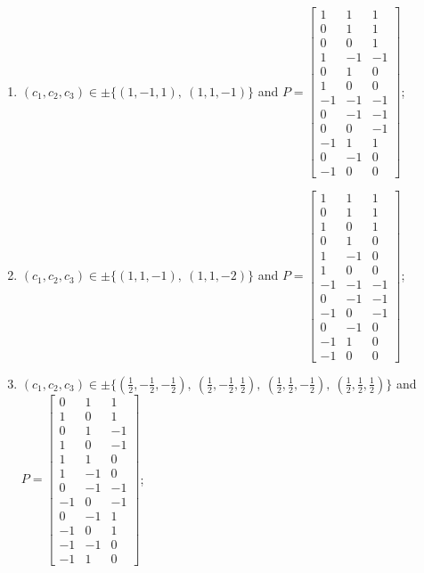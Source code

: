 \begin{enumerate}
\item[(d44)\,\newitem] $(c_1,c_2,c_3)\in \pm\{(1,-1,1),\allowbreak\ (1,1,-1)\}$ and $P=\begin{bmatrix}1&1&1\\0&1&1\\0&0&1\\1&-1&-1\\0&1&0\\1&0&0\\-1&-1&-1\\0&-1&-1\\0&0&-1\\-1&1&1\\0&-1&0\\-1&0&0\end{bmatrix}$;
\item[(d45)\,\newitem] $(c_1,c_2,c_3)\in \pm\{(1,1,-1),\allowbreak\ (1,1,-2)\}$ and $P=\begin{bmatrix}1&1&1\\0&1&1\\1&0&1\\0&1&0\\1&-1&0\\1&0&0\\-1&-1&-1\\0&-1&-1\\-1&0&-1\\0&-1&0\\-1&1&0\\-1&0&0\end{bmatrix}$;
\item[(d46)\,\newitem] $(c_1,c_2,c_3)\in \pm\{(\tfrac{1}{2},-\tfrac{1}{2},-\tfrac{1}{2}),\allowbreak\ (\tfrac{1}{2},-\tfrac{1}{2},\tfrac{1}{2}),\allowbreak\ (\tfrac{1}{2},\tfrac{1}{2},-\tfrac{1}{2}),\allowbreak\ (\tfrac{1}{2},\tfrac{1}{2},\tfrac{1}{2})\}$ and $P=\begin{bmatrix}0&1&1\\1&0&1\\0&1&-1\\1&0&-1\\1&1&0\\1&-1&0\\0&-1&-1\\-1&0&-1\\0&-1&1\\-1&0&1\\-1&-1&0\\-1&1&0\end{bmatrix}$;

\end{enumerate}
